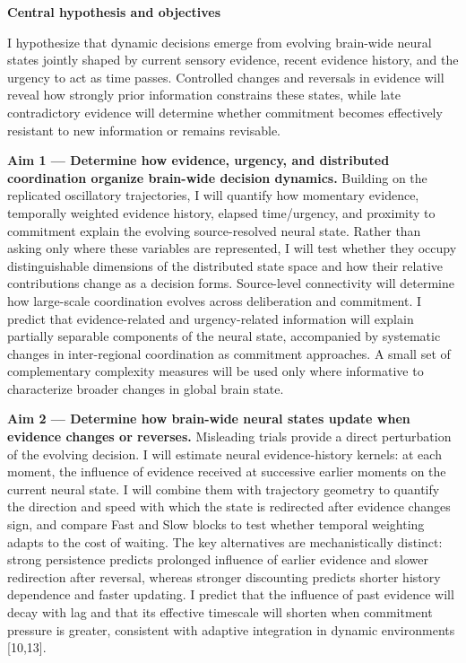 \documentclass[12pt,letterpaper]{article}
\newcommand{\nsercsection}[1]{\Needspace{2\baselineskip}\vspace{3pt}\noindent\textbf{#1}\par\vspace{0pt}}
\newcommand{\citep}[1]{[#1]}
\begin{document}
\nsercsection{Central hypothesis and objectives}
I hypothesize that dynamic decisions emerge from evolving brain-wide neural states jointly shaped by current sensory evidence, recent evidence history, and the urgency to act as time passes. Controlled changes and reversals in evidence will reveal how strongly prior information constrains these states, while late contradictory evidence will determine whether commitment becomes effectively resistant to new information or remains revisable.

\textbf{Aim 1 --- Determine how evidence, urgency, and distributed coordination organize brain-wide decision dynamics.} Building on the replicated oscillatory trajectories, I will quantify how momentary evidence, temporally weighted evidence history, elapsed time/urgency, and proximity to commitment explain the evolving source-resolved neural state. Rather than asking only where these variables are represented, I will test whether they occupy distinguishable dimensions of the distributed state space and how their relative contributions change as a decision forms. Source-level connectivity will determine how large-scale coordination evolves across deliberation and commitment. I predict that evidence-related and urgency-related information will explain partially separable components of the neural state, accompanied by systematic changes in inter-regional coordination as commitment approaches. A small set of complementary complexity measures will be used only where informative to characterize broader changes in global brain state.

\textbf{Aim 2 --- Determine how brain-wide neural states update when evidence changes or reverses.} Misleading trials provide a direct perturbation of the evolving decision. I will estimate neural evidence-history kernels: at each moment, the influence of evidence received at successive earlier moments on the current neural state. I will combine them with trajectory geometry to quantify the direction and speed with which the state is redirected after evidence changes sign, and compare Fast and Slow blocks to test whether temporal weighting adapts to the cost of waiting. The key alternatives are mechanistically distinct: strong persistence predicts prolonged influence of earlier evidence and slower redirection after reversal, whereas stronger discounting predicts shorter history dependence and faster updating. I predict that the influence of past evidence will decay with lag and that its effective timescale will shorten when commitment pressure is greater, consistent with adaptive integration in dynamic environments \citep{10,13}.
\end{document}
